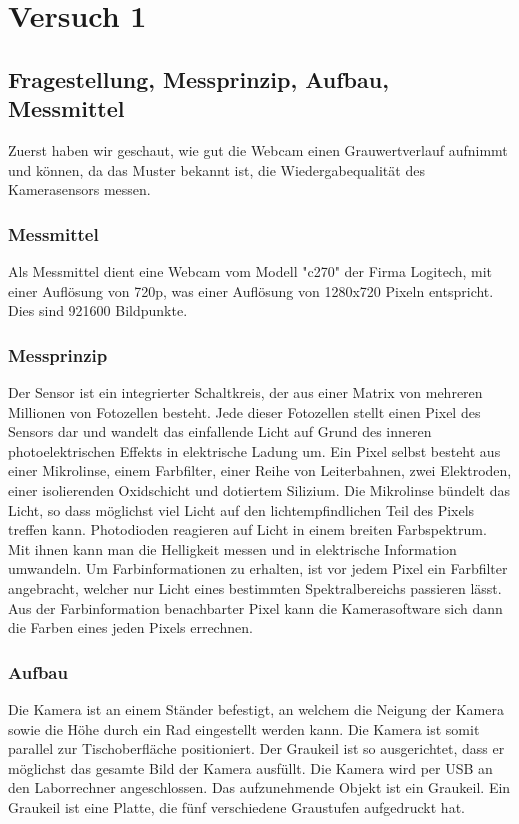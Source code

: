 \documentclass[TGAI_Laborbericht.tex]{subfiles}
\begin{document}
\chapter{Versuch 1}
\label{chap:VERSUCH_1}


\section{Fragestellung, Messprinzip, Aufbau, Messmittel}
\label{chap:VERSUCH_1_FRAGESTELLUNG}
Zuerst haben wir geschaut, wie gut die Webcam einen Grauwertverlauf aufnimmt und können, da das Muster bekannt ist, die Wiedergabequalität des Kamerasensors messen. 

\subsection{Messmittel}

Als Messmittel dient eine Webcam vom Modell "c270" der Firma Logitech, mit einer Auflösung von 720p, was einer Auflösung von 1280x720 Pixeln entspricht. Dies sind 921600 Bildpunkte.

\subsection{Messprinzip}

Der Sensor ist ein integrierter Schaltkreis, der aus einer Matrix von mehreren Millionen von Fotozellen besteht. Jede dieser Fotozellen stellt einen Pixel des Sensors dar und wandelt das einfallende Licht auf Grund des inneren photoelektrischen Effekts in elektrische Ladung um.
Ein Pixel selbst besteht aus einer Mikrolinse, einem Farbfilter, einer Reihe von Leiterbahnen, zwei Elektroden, einer isolierenden Oxidschicht und dotiertem Silizium.
Die Mikrolinse bündelt das Licht, so dass möglichst viel Licht auf den lichtempfindlichen Teil des Pixels treffen kann.
Photodioden reagieren auf Licht in einem breiten Farbspektrum. Mit ihnen kann man die Helligkeit messen und in elektrische Information umwandeln. Um Farbinformationen zu erhalten, ist vor jedem Pixel ein Farbfilter angebracht, welcher nur Licht eines bestimmten Spektralbereichs passieren lässt. Aus der Farbinformation benachbarter Pixel kann die Kamerasoftware sich dann die Farben eines jeden Pixels errechnen.

\subsection{Aufbau}
Die Kamera ist an einem Ständer befestigt, an welchem die Neigung der Kamera sowie die Höhe durch ein Rad eingestellt werden kann. Die Kamera ist somit parallel zur Tischoberfläche positioniert. Der Graukeil ist so ausgerichtet, dass er möglichst das gesamte Bild der Kamera ausfüllt. Die Kamera wird per USB an den Laborrechner angeschlossen. Das aufzunehmende Objekt ist ein Graukeil. Ein Graukeil ist eine Platte, die fünf verschiedene Graustufen aufgedruckt hat.
\end{document}
